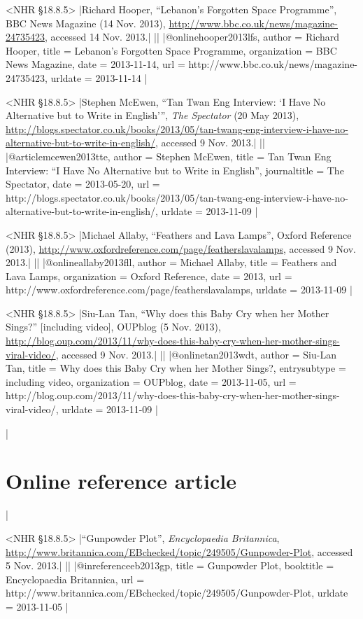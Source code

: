 \documentclass[extrafontsizes,11pt,a4paper,oneside]{memoir}
\begin{document}
\bibexample<NHR \S18.8.5>
|Richard Hooper, \enquote{Lebanon's Forgotten Space Programme}, BBC News Magazine (14 Nov. 2013), \url{http://www.bbc.co.uk/news/magazine-24735423}, accessed 14 Nov. 2013.|%
||%
|@online{hooper2013lfs,
  author = {Richard Hooper},
  title = {Lebanon's Forgotten Space Programme},
  organization = {BBC News Magazine},
  date = {2013-11-14},
  url = {http://www.bbc.co.uk/news/magazine-24735423},
  urldate = {2013-11-14}
}|

\bibexample<NHR \S18.8.5>
|Stephen McEwen, \enquote{Tan Twan Eng Interview: \enquote{I Have No Alternative but to Write in English}}, \emph{The Spectator} (20 May 2013), \url{http://blogs.spectator.co.uk/books/2013/05/tan-twang-eng-interview-i-have-no-alternative-but-to-write-in-english/}, accessed 9 Nov. 2013.|%
||%
|@article{mcewen2013tte,
  author = {Stephen McEwen},
  title = {Tan Twan Eng Interview: \enquote{I Have No Alternative but to Write in English}},
  journaltitle = {The Spectator},
  date = {2013-05-20},
  url = {http://blogs.spectator.co.uk/books/2013/05/tan-twang-eng-interview-i-have-no-alternative-but-to-write-in-english/},
  urldate = {2013-11-09}
}|

\bibexample<NHR \S18.8.5>
|Michael Allaby, \enquote{Feathers and Lava Lamps}, Oxford Reference (2013), \url{http://www.oxfordreference.com/page/featherslavalamps}, accessed 9 Nov. 2013.|%
||%
|@online{allaby2013fll,
  author = {Michael Allaby},
  title = {Feathers and Lava Lamps},
  organization = {Oxford Reference},
  date = {2013},
  url = {http://www.oxfordreference.com/page/featherslavalamps},
  urldate = {2013-11-09}
}|

\bibexample<NHR \S18.8.5>
|Siu-Lan Tan, \enquote{Why does this Baby Cry when her Mother Sings?} [including video], OUPblog (5 Nov. 2013), \url{http://blog.oup.com/2013/11/why-does-this-baby-cry-when-her-mother-sings-viral-video/}, accessed 9 Nov. 2013.|%
||%
|@online{tan2013wdt,
  author = {Siu-Lan Tan},
  title = {Why does this Baby Cry when her Mother Sings?},
  entrysubtype = {including video},
  organization = {OUPblog},
  date = {2013-11-05},
  url = {http://blog.oup.com/2013/11/why-does-this-baby-cry-when-her-mother-sings-viral-video/},
  urldate = {2013-11-09}
}|

\todoc|
\section{Online reference article}
|

\bibexample<NHR \S18.8.5>
|\enquote{Gunpowder Plot}, \emph{Encyclopaedia Britannica}, \url{http://www.britannica.com/EBchecked/topic/249505/Gunpowder-Plot}, accessed 5 Nov. 2013.|%
||%
|@inreference{eb2013gp,
  title = {Gunpowder Plot},
  booktitle = {Encyclopaedia Britannica},
  url = {http://www.britannica.com/EBchecked/topic/249505/Gunpowder-Plot},
  urldate = {2013-11-05}
}|
\end{document}
